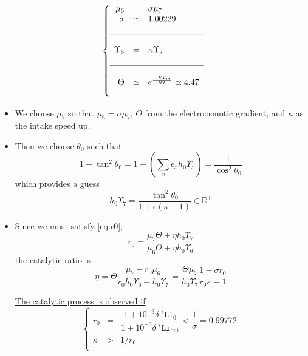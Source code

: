 \documentclass[aps,onecolumn,10pt]{revtex4}
\newcommand{\mychem}[1]{\mathtt{#1}}
\newcommand{\spLi}[1]{{~^{\mychem{#1}}\mychem{Li}}}
\newcommand{\deltaLi}{ {\delta\!\!\!\spLi{7}} }
\newcommand{\deltaLiOut}{{\deltaLi}_{\mathrm{out}}}
\begin{document}
\begin{equation}
\left\lbrace
\begin{array}{rcl}
		\mu_6     & = & \sigma \mu_7\\
		\sigma    & \simeq & 1.00229 \\
		\\
		\hline
		\\
		\Upsilon_6 & = & \kappa \Upsilon_7\\
		\\
		\hline
		\\
		\Theta     & \simeq  & e^{\frac{-F V_m}{RT} } \simeq 4.47\\
		\\
\end{array}
\right.
\end{equation}

\begin{itemize}
\item We choose $\mu_7$ so that $\mu_6=\sigma\mu_7$, $\Theta$ from the electroosmotic gradient, and $\kappa$ as the intake speed up.
\item Then we choose $\theta_0$ such that
\begin{equation}
\boxed{
	1+\tan^2\theta_0 = 1+\left(\sum_x \epsilon_x h_0 \Upsilon_x \right) = \dfrac{1}{\cos^2\theta_0}
	}
\end{equation}
which provides a guess
\begin{equation}
	h_0\Upsilon_7 = \dfrac{\tan^2\theta_0}{ 1+\epsilon\left(\kappa-1\right)} \in \mathbb{R}^+
\end{equation}
\item Since we must satisfy \eqref{eq:r0},
\begin{equation}
	r_0 = \dfrac{\mu_7\Theta+\eta h_0 \Upsilon_7}{\mu_6\Theta+\eta h_0 \Upsilon_6}
\end{equation}
the catalytic ratio is
\begin{equation}
	\eta = \Theta\dfrac{\mu_7-r_0\mu_6}{r_0 h_0 \Upsilon_6-h_0\Upsilon_7} 
	= \dfrac{\Theta\mu_7}{h_0\Upsilon_7} \dfrac{1-\sigma r_0}{r_0\kappa-1}
\end{equation}

{
	\underline{The catalytic process is observed if}
\begin{equation}
\boxed{
\left\lbrace
\begin{array}{rcl}
	r_0 & = & \dfrac{1+10^{-3}\deltaLi_0}{1+10^{-3}\deltaLiOut} < \dfrac{1}{\sigma} = 0.99772\\
	\kappa & > & 1/r_0\\
\end{array}
\right.
}
\end{equation}
}


\end{itemize}
\end{document}
